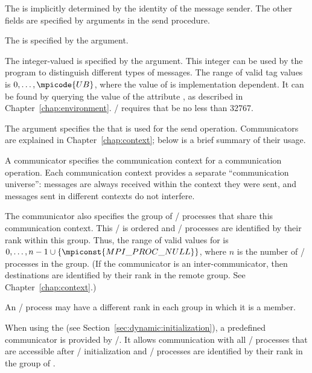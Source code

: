 The  is implicitly determined by the identity of the
message sender.  The other fields are specified by arguments in the send
procedure.

The  is specified by the 
argument.

The integer-valued  is specified by the  argument.
This integer can be used by the program to distinguish different types of
messages.
The range of valid tag values is $0,\ldots,\mpicode{UB}$, where the value of
 is
implementation dependent. It can be found by querying the
value of the attribute , as
described in Chapter~\ref{chap:environment}.  \MPI/ requires that
 be no less than 32767.

The  argument specifies the  that is used for
the send operation.
Communicators are explained in Chapter~\ref{chap:context}; below is a brief
summary of their usage.

A communicator specifies the
communication context for a communication operation.
Each communication context provides a separate ``communication
universe'': messages are always received within the context they were
sent, and messages sent in different contexts do not interfere.

The communicator also specifies the group of \MPI/ processes that share this
communication context.  This \MPI/ 
is ordered and \MPI/ processes are identified by their
rank within this group.  Thus, the range of valid values for  is
$0, \ldots, n-1 \cup \{\mpiconst{MPI\_PROC\_NULL}\}$, where $n$ is the number of
\MPI/ processes in the group.  (If the communicator is an inter-communicator, then
destinations are identified by their rank in the remote group.  See
Chapter~\ref{chap:context}.)

An \MPI/ process may have a different rank in each group in which it is a member.

When using the \wpm{} (see Section~\ref{sec:dynamic:initialization}),
a predefined communicator  is provided by \MPI/. It
allows communication with all \MPI/ processes that are accessible after \MPI/
initialization and \MPI/ processes are identified by their rank in the
group of .

